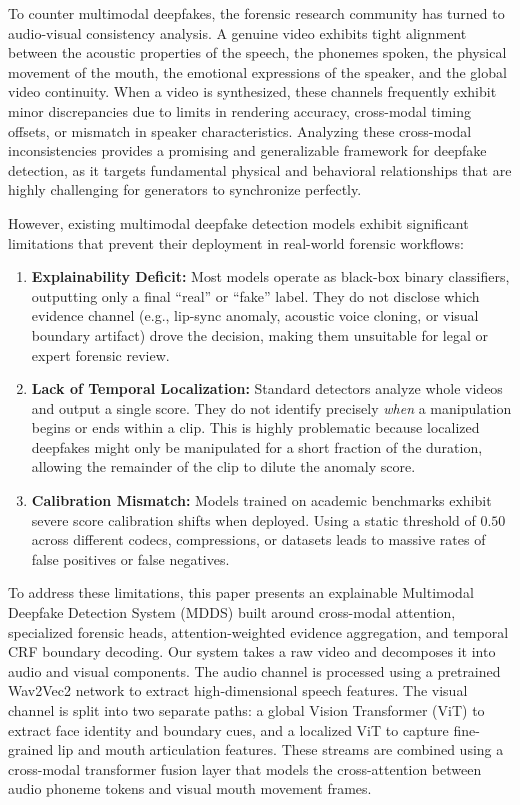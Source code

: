 \documentclass[journal,10pt,onecolumn,draftclsnofoot]{IEEEtran}
\begin{document}
To counter multimodal deepfakes, the forensic research community has turned to audio-visual consistency analysis. A genuine video exhibits tight alignment between the acoustic properties of the speech, the phonemes spoken, the physical movement of the mouth, the emotional expressions of the speaker, and the global video continuity. When a video is synthesized, these channels frequently exhibit minor discrepancies due to limits in rendering accuracy, cross-modal timing offsets, or mismatch in speaker characteristics. Analyzing these cross-modal inconsistencies provides a promising and generalizable framework for deepfake detection, as it targets fundamental physical and behavioral relationships that are highly challenging for generators to synchronize perfectly.

However, existing multimodal deepfake detection models exhibit significant limitations that prevent their deployment in real-world forensic workflows:
\begin{enumerate}
    \item \textbf{Explainability Deficit:} Most models operate as black-box binary classifiers, outputting only a final ``real'' or ``fake'' label. They do not disclose which evidence channel (e.g., lip-sync anomaly, acoustic voice cloning, or visual boundary artifact) drove the decision, making them unsuitable for legal or expert forensic review.
    \item \textbf{Lack of Temporal Localization:} Standard detectors analyze whole videos and output a single score. They do not identify precisely \textit{when} a manipulation begins or ends within a clip. This is highly problematic because localized deepfakes might only be manipulated for a short fraction of the duration, allowing the remainder of the clip to dilute the anomaly score.
    \item \textbf{Calibration Mismatch:} Models trained on academic benchmarks exhibit severe score calibration shifts when deployed. Using a static threshold of $0.50$ across different codecs, compressions, or datasets leads to massive rates of false positives or false negatives.
\end{enumerate}

To address these limitations, this paper presents an explainable Multimodal Deepfake Detection System (MDDS) built around cross-modal attention, specialized forensic heads, attention-weighted evidence aggregation, and temporal CRF boundary decoding. Our system takes a raw video and decomposes it into audio and visual components. The audio channel is processed using a pretrained Wav2Vec2 network to extract high-dimensional speech features. The visual channel is split into two separate paths: a global Vision Transformer (ViT) to extract face identity and boundary cues, and a localized ViT to capture fine-grained lip and mouth articulation features. These streams are combined using a cross-modal transformer fusion layer that models the cross-attention between audio phoneme tokens and visual mouth movement frames. 
\end{document}
